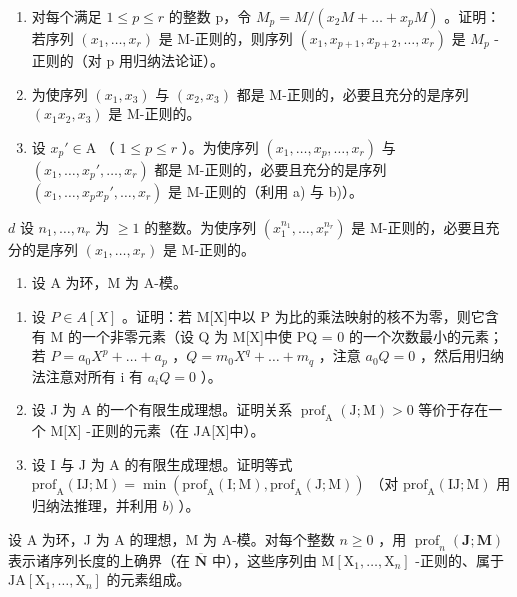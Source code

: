 \begin{enumerate}
\def\labelenumi{\alph{enumi})}
\item
  对每个满足 \(1 \leqslant p \leqslant r\) 的整数 p，令 \(M_{p} = M/(x_{2}M + \ldots + x_{p}M)\) 。证明：若序列 \((x_{1}, \ldots, x_{r})\) 是 M-正则的，则序列 \((x_{1}, x_{p+1}, x_{p+2}, \ldots, x_{r})\) 是 \(M_{p}\) -正则的（对 p 用归纳法论证）。
\item
  为使序列 \((x_{1}, x_{3})\) 与 \((x_{2}, x_{3})\) 都是 M-正则的，必要且充分的是序列 \((x_{1}x_{2}, x_{3})\) 是 M-正则的。
\item
  设 \(x_p' \in \mathrm{A}\) （ \(1 \leqslant p \leqslant r\) ）。为使序列 \((x_1, \ldots, x_p, \ldots, x_r)\) 与 \((x_1, \ldots, x_p', \ldots, x_r)\) 都是 M-正则的，必要且充分的是序列 \((x_1, \ldots, x_p x_p', \ldots, x_r)\) 是 M-正则的（利用 a) 与 b)）。
\end{enumerate}

\(d\) 设 \(n_1,\ldots ,n_r\) 为 \(\geqslant 1\) 的整数。为使序列 \((x_{1}^{n_{1}},\dots,x_{r}^{n_{r}})\) 是 M-正则的，必要且充分的是序列 \((x_{1},\ldots ,x_{r})\) 是 M-正则的。

\begin{enumerate}
\def\labelenumi{\arabic{enumi})}
\setcounter{enumi}{11}
\tightlist
\item
  设 A 为环，M 为 A-模。
\end{enumerate}

\begin{enumerate}
\def\labelenumi{\alph{enumi})}
\item
  设 \(P \in A[X]\) 。证明：若 M{[}X{]}中以 P 为比的乘法映射的核不为零，则它含有 M 的一个非零元素（设 Q 为 M{[}X{]}中使 PQ = 0 的一个次数最小的元素；若 \(P = a_{0}X^{p} + \ldots + a_{p}\) ，\(Q = m_{0}X^{q} + \ldots + m_{q}\) ，注意 \(a_{0}Q = 0\) ，然后用归纳法注意对所有 i 有 \(a_{i}Q = 0\) ）。
\item
  设 J 为 A 的一个有限生成理想。证明关系 \(\operatorname{prof}_{\mathrm{A}}(\mathrm{J};\mathrm{M}) > 0\) 等价于存在一个 M{[}X{]} -正则的元素（在 JA{[}X{]}中）。
\item
  设 I 与 J 为 A 的有限生成理想。证明等式 \(\mathrm{prof}_{\mathrm{A}}(\mathrm{IJ};\mathrm{M}) = \min (\mathrm{prof}_{\mathrm{A}}(\mathrm{I};\mathrm{M}),\mathrm{prof}_{\mathrm{A}}(\mathrm{J};\mathrm{M}))\) （对 \(\mathrm{prof}_{\mathrm{A}}(\mathrm{IJ};\mathrm{M})\) 用归纳法推理，并利用 \(b)\) ）。
\end{enumerate}

设 A 为环，J 为 A 的理想，M 为 A-模。对每个整数 \(n \geqslant 0\) ，用 \(\operatorname{prof}_{n}(\mathbf{J}; \mathbf{M})\) 表示诸序列长度的上确界（在 \(\overline{\mathbf{N}}\) 中），这些序列由 \(\mathrm{M}[\mathrm{X}_{1}, \ldots, \mathrm{X}_{n}]\) -正则的、属于 \(\mathrm{JA}[\mathrm{X}_{1}, \ldots, \mathrm{X}_{n}]\) 的元素组成。

